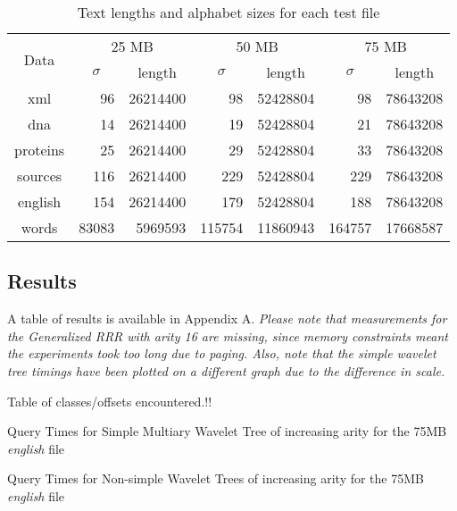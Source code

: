 \begin{center}
\begin{table}[h]
\begin{tabular}{crrrrrr}
\toprule
\multirow{2}{*}{Data} & \multicolumn{2}{c}{25 MB} & \multicolumn{2}{c}{50 MB} &  
	\multicolumn{2}{c}{75 MB}\\
		  \cmidrule(r){2-7}
	      &\multicolumn{1}{c}{$\sigma$}& \multicolumn{1}{c}{length}
		  &\multicolumn{1}{c}{$\sigma$}&\multicolumn{1}{c}{length}
		  &\multicolumn{1}{c}{$\sigma$}&\multicolumn{1}{c}{length}\\
\midrule
xml 	  & 96	   & 26214400 & 98 	   & 52428804 & 98 	   & 78643208 \\
dna 	  & 14     & 26214400 & 19 	   & 52428804 & 21     & 78643208 \\
proteins  & 25     & 26214400 & 29     & 52428804 & 33     & 78643208 \\
sources   & 116    & 26214400 & 229    & 52428804 & 229    & 78643208 \\
english   & 154    & 26214400 & 179    & 52428804 & 188    & 78643208 \\
words     & 83083  & 5969593  & 115754 & 11860943 & 164757 & 17668587 \\
\bottomrule
\end{tabular}
\caption{Text lengths and alphabet sizes for each test file}
\label{tab:files}
\end{table}
\end{center}

\subsection{Results}
A table of results is available in Appendix A. \emph{Please note that 
measurements for the Generalized RRR with arity 16 are missing, since memory 
constraints meant the experiments took too long due to paging. Also, note that
the simple wavelet tree timings have been plotted on a different graph due to
the difference in scale.}

Table of classes/offsets encountered.!!

			{Query Times for Simple Multiary Wavelet Tree of increasing arity
			for the 75MB \emph{english} file}
			
			{Query Times for Non-simple Wavelet Trees of increasing arity
			for the 75MB \emph{english} file}
			
